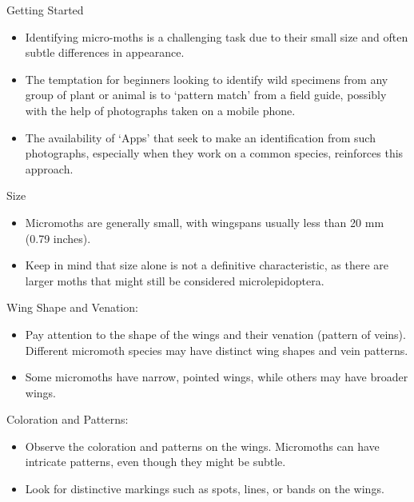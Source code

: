 \documentclass[
  ignorenonframetext,
]{beamer}
\providecommand{\tightlist}{%
  \setlength{\itemsep}{0pt}\setlength{\parskip}{0pt}}
\begin{document}
\begin{frame}{Getting Started}
\protect\hypertarget{getting-started}{}
\begin{itemize}
\tightlist
\item
  Identifying micro-moths is a challenging task due to their small size
  and often subtle differences in appearance.
\item
  The temptation for beginners looking to identify wild specimens from
  any group of plant or animal is to `pattern match' from a field guide,
  possibly with the help of photographs taken on a mobile phone.
\item
  The availability of `Apps' that seek to make an identification from
  such photographs, especially when they work on a common species,
  reinforces this approach.
\end{itemize}
\end{frame}

\begin{frame}{Size}
\protect\hypertarget{size}{}
\begin{itemize}
\tightlist
\item
  Micromoths are generally small, with wingspans usually less than 20 mm
  (0.79 inches).
\item
  Keep in mind that size alone is not a definitive characteristic, as
  there are larger moths that might still be considered
  microlepidoptera.
\end{itemize}
\end{frame}

\begin{frame}{Wing Shape and Venation:}
\protect\hypertarget{wing-shape-and-venation}{}
\begin{itemize}
\tightlist
\item
  Pay attention to the shape of the wings and their venation (pattern of
  veins). Different micromoth species may have distinct wing shapes and
  vein patterns.
\item
  Some micromoths have narrow, pointed wings, while others may have
  broader wings.
\end{itemize}
\end{frame}

\begin{frame}{Coloration and Patterns:}
\protect\hypertarget{coloration-and-patterns}{}
\begin{itemize}
\tightlist
\item
  Observe the coloration and patterns on the wings. Micromoths can have
  intricate patterns, even though they might be subtle.
\item
  Look for distinctive markings such as spots, lines, or bands on the
  wings.
\end{itemize}
\end{frame}
\end{document}
